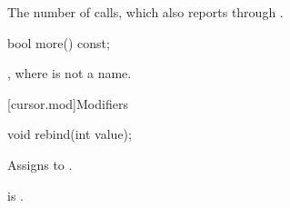 \begin{itemdescr}
\pnum
\returns
The number of calls, which  also reports through .
\end{itemdescr}

%
\begin{itemdecl}
bool more() const;
\end{itemdecl}

\begin{itemdescr}
\pnum
\returns
{}, where  is not a name.
\end{itemdescr}

[cursor.mod]{Modifiers}

%
\begin{itemdecl}
void rebind(int value);
\end{itemdecl}

\begin{itemdescr}
\pnum
\effects
Assigns  to .

\pnum
\ensures
{} is .
\end{itemdescr}
